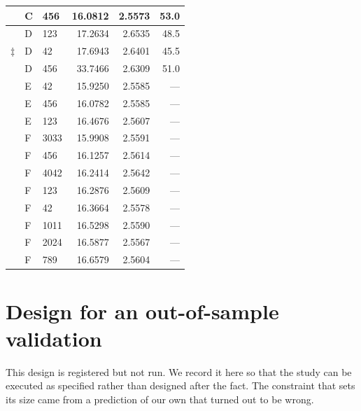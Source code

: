 \documentclass[11pt,letterpaper]{article}
\begin{document}
\begin{table}[htbp]
\begin{tabular}{cllrrr}
 & C & 456 & 16.0812 & 2.5573 & 53.0 \\
\midrule
 & D & 123 & 17.2634 & 2.6535 & 48.5 \\
$\ddagger$ & D & 42 & 17.6943 & 2.6401 & 45.5 \\
 & D & 456 & 33.7466 & 2.6309 & 51.0 \\
\midrule
 & E & 42 & 15.9250 & 2.5585 & --- \\
 & E & 456 & 16.0782 & 2.5585 & --- \\
 & E & 123 & 16.4676 & 2.5607 & --- \\
\midrule
 & F & 3033 & 15.9908 & 2.5591 & --- \\
 & F & 456 & 16.1257 & 2.5614 & --- \\
 & F & 4042 & 16.2414 & 2.5642 & --- \\
 & F & 123 & 16.2876 & 2.5609 & --- \\
 & F & 42 & 16.3664 & 2.5578 & --- \\
 & F & 1011 & 16.5298 & 2.5590 & --- \\
 & F & 2024 & 16.5877 & 2.5567 & --- \\
 & F & 789 & 16.6579 & 2.5604 & --- \\
\bottomrule
\end{tabular}
\end{table}

\section{Design for an out-of-sample validation}
\label{app:prereg}

This design is registered but not run. We record it here so that the study can be executed as specified rather than designed after the fact. The constraint that sets its size came from a prediction of our own that turned out to be wrong.
\end{document}
